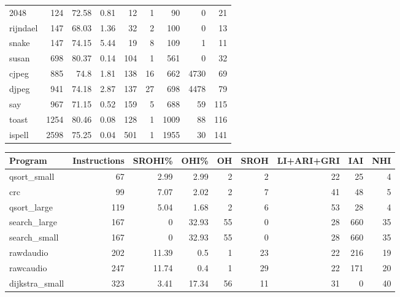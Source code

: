 \begin{tabular}{lrrrrrrrr}
 2048            &      124 &    72.58 &   0.81 &   12 &    1 &     90 &     0 &    21 \\
 rijndael        &      147 &    68.03 &   1.36 &   32 &    2 &    100 &     0 &    13 \\
 snake           &      147 &    74.15 &   5.44 &   19 &    8 &    109 &     1 &    11 \\
 susan           &      698 &    80.37 &   0.14 &  104 &    1 &    561 &     0 &    32 \\
 cjpeg           &      885 &    74.8  &   1.81 &  138 &   16 &    662 &  4730 &    69 \\
 djpeg           &      941 &    74.18 &   2.87 &  137 &   27 &    698 &  4478 &    79 \\
 say             &      967 &    71.15 &   0.52 &  159 &    5 &    688 &    59 &   115 \\
 toast           &     1254 &    80.46 &   0.08 &  128 &    1 &   1009 &    88 &   116 \\
 ispell          &     2598 &    75.25 &   0.04 &  501 &    1 &   1955 &    30 &   141 \\
\hline
\end{tabular}\begin{tabular}{lrrrrrrrr}
\hline
 Program         &   Instructions &   SROHI\% &   OHI\% &   OH &   SROH &   LI+ARI+GRI &   IAI &   NHI \\
\hline
 qsort\_small     &             67 &     2.99 &   2.99 &    2 &      2 &           22 &    25 &     4 \\
 crc             &             99 &     7.07 &   2.02 &    2 &      7 &           41 &    48 &     5 \\
 qsort\_large     &            119 &     5.04 &   1.68 &    2 &      6 &           53 &    28 &     4 \\
 search\_large    &            167 &     0    &  32.93 &   55 &      0 &           28 &   660 &    35 \\
 search\_small    &            167 &     0    &  32.93 &   55 &      0 &           28 &   660 &    35 \\
 rawdaudio       &            202 &    11.39 &   0.5  &    1 &     23 &           22 &   216 &    19 \\
 rawcaudio       &            247 &    11.74 &   0.4  &    1 &     29 &           22 &   171 &    20 \\
 dijkstra\_small  &            323 &     3.41 &  17.34 &   56 &     11 &           31 &     0 &    40 \\

\end{tabular}
